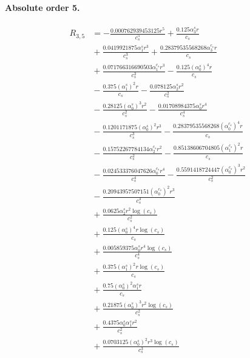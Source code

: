 \documentclass[10pt]{article}
\begin{document}
\paragraph{Absolute order 5.}
\begin{align*}
R_{3,5} &=  - \frac{0.000762939453125 r^{5}}{c_{s}^{5}} + \frac{0.125 \alpha_{3}^s r}{c_{s}} \\
&{}  + \frac{0.0419921875 \alpha_{1}^s r^{3}}{c_{s}^{3}} + \frac{0.28379535568268 \alpha_{3}^{c_s} r}{c_{s}} \\
&{}  + \frac{0.071766316690503 \alpha_{1}^{c_s} r^{3}}{c_{s}^{3}} - \frac{0.125 \left(\alpha_{0}^s\right)^{4} r}{c_{s}} \\
&{}  - \frac{0.375 \left(\alpha_{1}^s\right)^{2} r}{c_{s}} - \frac{0.078125 \alpha_{2}^s r^{2}}{c_{s}^{2}} \\
&{}  - \frac{0.28125 \left(\alpha_{0}^s\right)^{3} r^{2}}{c_{s}^{2}} - \frac{0.01708984375 \alpha_{0}^s r^{4}}{c_{s}^{4}} \\
&{}  - \frac{0.1201171875 \left(\alpha_{0}^s\right)^{2} r^{3}}{c_{s}^{3}} - \frac{0.28379535568268 \left(\alpha_{0}^{c_s}\right)^{4} r}{c_{s}} \\
&{}  - \frac{0.15752267784134 \alpha_{2}^{c_s} r^{2}}{c_{s}^{2}} - \frac{0.85138606704805 \left(\alpha_{1}^{c_s}\right)^{2} r}{c_{s}} \\
&{}  - \frac{0.024533376047626 \alpha_{0}^{c_s} r^{4}}{c_{s}^{4}} - \frac{0.5591418724447 \left(\alpha_{0}^{c_s}\right)^{3} r^{2}}{c_{s}^{2}} \\
&{}  - \frac{0.20943957507151 \left(\alpha_{0}^{c_s}\right)^{2} r^{3}}{c_{s}^{3}} \\
&{}  + \frac{0.0625 \alpha_{2}^s r^{2} \log{\left(c_{s} \right)}}{c_{s}^{2}} \\
&{}  + \frac{0.125 \left(\alpha_{0}^s\right)^{4} r \log{\left(c_{s} \right)}}{c_{s}} \\
&{}  + \frac{0.005859375 \alpha_{0}^s r^{4} \log{\left(c_{s} \right)}}{c_{s}^{4}} \\
&{}  + \frac{0.375 \left(\alpha_{1}^s\right)^{2} r \log{\left(c_{s} \right)}}{c_{s}} \\
&{}  + \frac{0.75 \left(\alpha_{0}^s\right)^{2} \alpha_{1}^s r}{c_{s}} \\
&{}  + \frac{0.21875 \left(\alpha_{0}^s\right)^{3} r^{2} \log{\left(c_{s} \right)}}{c_{s}^{2}} \\
&{}  + \frac{0.4375 \alpha_{0}^s \alpha_{1}^s r^{2}}{c_{s}^{2}} \\
&{}  + \frac{0.0703125 \left(\alpha_{0}^s\right)^{2} r^{3} \log{\left(c_{s} \right)}}{c_{s}^{3}} \\

\end{align*}
\end{document}
